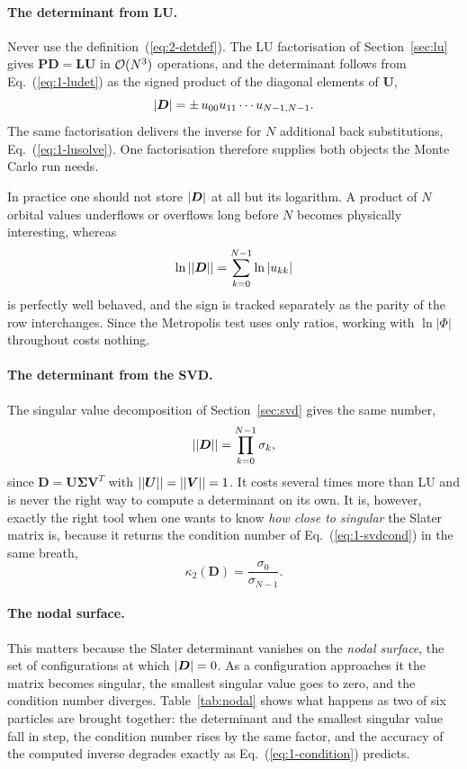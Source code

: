 \paragraph{The determinant from LU.}
Never use the definition~(\ref{eq:2-detdef}).  The LU factorisation of
Section~\ref{sec:lu} gives $\bm{P}\bm{D}=\bm{L}\bm{U}$ in $\mathcal{O}(N^3)$
operations, and the determinant follows from Eq.~(\ref{eq:1-ludet}) as the
signed product of the diagonal elements of $\bm{U}$,
\begin{equation}
  {|\boldsymbol{D}|} = \pm\,u_{00}u_{11}\cdots u_{N-1,N-1} .
  \label{eq:2-detfromlu}
\end{equation}
The same factorisation delivers the inverse for $N$ additional back
substitutions, Eq.~(\ref{eq:1-lusolve}).  One factorisation therefore supplies
both objects the Monte Carlo run needs.

In practice one should not store ${|\boldsymbol{D}|}$ at all but its logarithm.  A
product of $N$ orbital values underflows or overflows long before $N$ becomes
physically interesting, whereas
\begin{equation}
  \ln\left|{|\boldsymbol{D}|}\right| = \sum_{k=0}^{N-1}\ln|u_{kk}|
  \label{eq:2-logdet}
\end{equation}
is perfectly well behaved, and the sign is tracked separately as the parity of
the row interchanges.  Since the Metropolis test uses only ratios, working
with $\ln|\Phi|$ throughout costs nothing.

\paragraph{The determinant from the SVD.}
The singular value decomposition of Section~\ref{sec:svd} gives the same
number,
\begin{equation}
  \left|{|\boldsymbol{D}|}\right| = \prod_{k=0}^{N-1}\sigma_k ,
  \label{eq:2-detfromsvd}
\end{equation}
since $\bm{D}=\bm{U}\bm{\Sigma}\bm{V}^{T}$ with $|{|\boldsymbol{U}|}|=|{|\boldsymbol{V}|}|=1$.  It
costs several times more than LU and is never the right way to compute a
determinant on its own.  It is, however, exactly the right tool when one wants
to know \emph{how close to singular} the Slater matrix is, because it returns
the condition number of Eq.~(\ref{eq:1-svdcond}) in the same breath,
\begin{equation}
  \kappa_2(\bm{D}) = \frac{\sigma_0}{\sigma_{N-1}} .
  \label{eq:2-slaterkappa}
\end{equation}

\paragraph{The nodal surface.}
This matters because the Slater determinant vanishes on the \emph{nodal
surface}, the set of configurations at which ${|\boldsymbol{D}|}=0$.  As a configuration
approaches it the matrix becomes singular, the smallest singular value goes to
zero, and the condition number diverges.  Table~\ref{tab:nodal} shows what
happens as two of six particles are brought together: the determinant and the
smallest singular value fall in step, the condition number rises by the same
factor, and the accuracy of the computed inverse degrades exactly as
Eq.~(\ref{eq:1-condition}) predicts.

